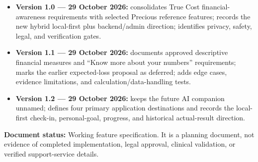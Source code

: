 \documentclass[11pt,a4paper]{article}
\begin{document}
\begin{itemize}
  \item \textbf{Version 1.0 --- 29 October 2026:} consolidates True Cost financial-awareness requirements with selected Precious reference features; records the new hybrid local-first plus backend/admin direction; identifies privacy, safety, legal, and verification gates.
  \item \textbf{Version 1.1 --- 29 October 2026:} documents approved descriptive financial measures and ``Know more about your numbers'' requirements; marks the earlier expected-loss proposal as deferred; adds edge cases, evidence limitations, and calculation/data-handling tests.
  \item \textbf{Version 1.2 --- 29 October 2026:} keeps the future AI companion unnamed; defines four primary application destinations and records the local-first check-in, personal-goal, progress, and historical actual-result direction.
\end{itemize}

\vfill
\noindent\textbf{Document status:} Working feature specification. It is a planning document, not evidence of completed implementation, legal approval, clinical validation, or verified support-service details.
\end{document}
